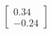 \documentclass[preview]{standalone}
\begin{document}
\begin{align*}
\begin{bmatrix} 0.34 \\ -0.24 \end{bmatrix}
\end{align*}
\end{document}
